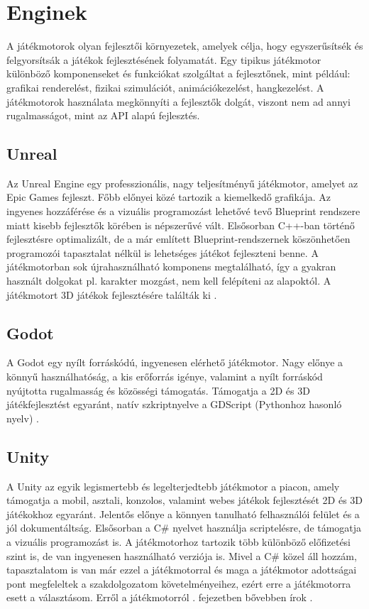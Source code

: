 \documentclass[]{thesis-ekf}
\theoremstyle{definition}
\theoremstyle{remark}
\begin{document}
\section{Enginek}

A játékmotorok olyan fejlesztői környezetek, amelyek célja, hogy egyszerűsítsék és felgyorsítsák a játékok fejlesztésének folyamatát. Egy tipikus játékmotor különböző komponenseket és funkciókat szolgáltat a fejlesztőnek, mint például: grafikai renderelést, fizikai szimulációt, animációkezelést, hangkezelést. A játékmotorok használata megkönnyíti a fejlesztők dolgát, viszont nem ad annyi rugalmasságot, mint az API alapú fejlesztés.

\subsection{Unreal}

Az Unreal Engine egy professzionális, nagy teljesítményű játékmotor, amelyet az Epic Games fejleszt. Főbb előnyei közé tartozik a kiemelkedő grafikája. Az ingyenes hozzáférése és a vizuális programozást lehetővé tevő Blueprint rendszere miatt kisebb fejlesztők körében is népszerűvé vált. Elsősorban C++-ban történő fejlesztésre optimalizált, de a már említett Blueprint-rendszernek köszönhetően programozói tapasztalat nélkül is lehetséges játékot fejleszteni benne. A játékmotorban sok újrahasználható komponens megtalálható, így a gyakran használt dolgokat pl. karakter mozgást, nem kell felépíteni az alapoktól. A játékmotort 3D játékok fejlesztésére találták ki \cite{UnrealEngine}.

\subsection{Godot}

A Godot egy nyílt forráskódú, ingyenesen elérhető játékmotor. Nagy előnye a könnyű használhatóság, a kis erőforrás igénye, valamint a nyílt forráskód nyújtotta rugalmasság és közösségi támogatás. Támogatja a 2D és 3D játékfejlesztést egyaránt, natív szkriptnyelve a GDScript (Pythonhoz hasonló nyelv) \cite{Godot} \cite{GitHubGodot}.

\subsection{Unity}

A Unity az egyik legismertebb és legelterjedtebb játékmotor a piacon, amely támogatja a mobil, asztali, konzolos, valamint webes játékok fejlesztését 2D és 3D játékokhoz egyaránt. Jelentős előnye a könnyen tanulható felhasználói felület és a jól dokumentáltság. Elsősorban a C\# nyelvet használja scriptelésre, de támogatja a vizuális programozást is. A játékmotorhoz tartozik több különböző előfizetési szint is, de van ingyenesen használható verziója is.  Mivel a C\# közel áll hozzám, tapasztalatom is van már ezzel a játékmotorral és maga a játékmotor adottságai pont megfeleltek a szakdolgozatom követelményeihez, ezért erre a játékmotorra esett a választásom. Erről a játékmotorról . fejezetben bővebben írok \cite{Unity}.
\end{document}
